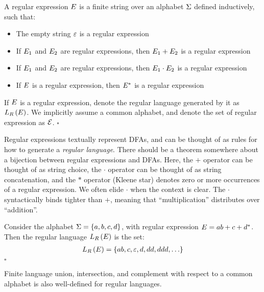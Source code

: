 \begin{definition}
  A regular expression \(E\)
  is a finite string over an alphabet \(\Sigma\)
  defined inductively, such that:
  \begin{itemize}
    \item
      The empty string \(\varepsilon\) is a regular expression

    \item
      If \(E_1\) and \(E_2\) are regular expressions,
      then \(E_1 + E_2\) is a regular expression

    \item
      If \(E_1\) and \(E_2\) are regular expressions,
      then \(E_1 \cdot E_2\) is a regular expression

    \item
      If \(E\) is a regular expression,
      then \(E^\ast\) is a regular expression
  \end{itemize}
  If \(E\) is a regular expression, denote the 
  regular language generated by it as \(L_{R}\left(E\right)\).
  We implicitly assume a common alphabet,
  and denote the set of regular expression as \(\mathcal{E}\).
  \hfill\(\square\)
\end{definition}

Regular expressions textually represent DFAs, and can be thought of
as rules for how to generate a \textit{regular language}.
There should be a theorem somewhere about a bijection between
regular expressions and DFAs.
Here, the \(+\) operator can be thought of as string choice,
the \(\cdot\) operator can be thought of as string concatenation,
and the \(\ast\) operator (Kleene star) denotes zero or more occurrences
of a regular expression.
We often elide \(\cdot\) when the context is clear.
The \(\cdot\) syntactically
binds tighter than \(+\), meaning that ``multiplication''
distributes over ``addition''.

\begin{example}
  Consider the alphabet \(\Sigma = \left\{a, b, c, d\right\}\),
  with regular expression \(E = ab + c + d^\ast\).
  Then the regular language \(L_{R}\left(E\right)\) is the set:
  \begin{align*}
    L_{R}\left(E\right) =
      \left\{ab, c, \varepsilon, d, dd, ddd, \ldots\right\}
  \end{align*}
  \hfill\(\square\)
\end{example}

Finite language union, intersection, and complement
with respect to a common alphabet
is also well-defined for regular languages.

